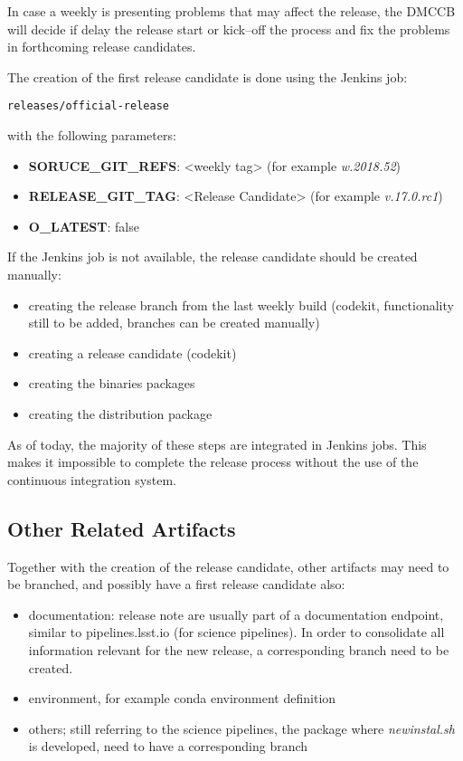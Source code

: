 In case a weekly is presenting problems that may affect the release, the DMCCB will decide if delay the release start or kick--off the process and fix the problems in forthcoming release candidates.

The creation of the first release candidate is done using the Jenkins job:

\begin{verbatim}
releases/official-release
\end{verbatim}

with the following parameters:

\begin{itemize}
\item {\bf SORUCE\_GIT\_REFS}: <weekly tag> (for example \textit{w.2018.52})
\item {\bf RELEASE\_GIT\_TAG}: <Release Candidate> (for example \textit{v.17.0.rc1})
\item {\bf O\_LATEST}: false
\end{itemize}


If the Jenkins job is not available, the release candidate should be created manually:

\begin{itemize}
\item creating the release branch from the last weekly build (codekit, functionality still to be added, branches can be created manually)
\item creating a release candidate (codekit)
\item creating the binaries packages
\item creating the distribution package
\end{itemize}

As of today, the majority of these steps are integrated in Jenkins jobs. This makes it impossible to complete the release process without the use of the continuous integration system.

\subsection{Other Related Artifacts}

Together with the creation of the release candidate, other artifacts may need to be branched, and possibly have a first release candidate also:

\begin{itemize}
\item documentation: release note are usually part of a documentation endpoint, similar to pipelines.lsst.io (for science pipelines). In order to consolidate all information relevant for the new release, a corresponding branch need to be created.
\item environment, for example conda environment definition
\item others; still referring to the science pipelines, the package where \textit{newinstal.sh} is developed, need to have a corresponding branch
\end{itemize}


